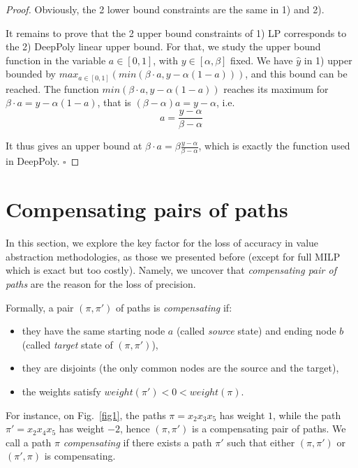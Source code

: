 \documentclass{llncs}
\begin{document}
\begin{proof}
Obviously, the 2 lower bound constraints are the same in 1) and 2).

It remains to prove that the 2 upper bound constraints of 1) LP corresponds to the 2) DeepPoly linear upper bound. For that, we study the upper bound function in the variable $a \in  [0,1]$, with $y \in [\alpha,\beta]$ fixed. We have $\hat{y}$ in 1) upper bounded by $max_{a \in [0,1]} (min(\beta \cdot a, y - \alpha (1-a)))$, and this bound can be reached. 
The function $min(\beta \cdot a, y - \alpha (1-a))$ reaches its maximum for 
$\beta \cdot a = y - \alpha (1-a)$, that is 
$(\beta - \alpha) a = y - \alpha$, i.e. 
$$ a = \frac{y - \alpha}{\beta-\alpha}$$

It thus gives an upper bound at 
$\beta \cdot a = \beta \frac{y - \alpha}{\beta-\alpha}$, which is exactly the function used in DeepPoly.
\hfill $\square$
\end{proof}







\section{Compensating pairs of paths}
\label{Sec.comp}

In this section, we explore the key factor for the loss of accuracy in value abstraction methodologies, as those we presented before (except for full MILP which is exact but too costly). 
Namely, we uncover that \emph{compensating pair of paths} are the reason for the loss of precision.

Formally, a pair $(\pi,\pi')$ of paths is {\em compensating} if:
\begin{itemize}
 \item they have the same starting node $a$ (called {\em source} state) and ending node $b$ (called {\em target} state of $(\pi,\pi')$),
 \item they are disjoints (the only common nodes are the source and the target),
 \item the weights satisfy $weight(\pi') < 0 < weight(\pi)$.
\end{itemize}

For instance, on Fig.~\ref{fig1}, the paths $\pi= x_2 x_3 x_5$ has weight $1$, while the
path $\pi'= x_2 x_4 x_5$ has weight $-2$, hence $(\pi,\pi')$ is a compensating pair of paths.
We call a path $\pi$ {\em compensating} if there exists a path $\pi'$ such that either $(\pi,\pi')$ or 
$(\pi',\pi)$ is compensating.
\end{document}
